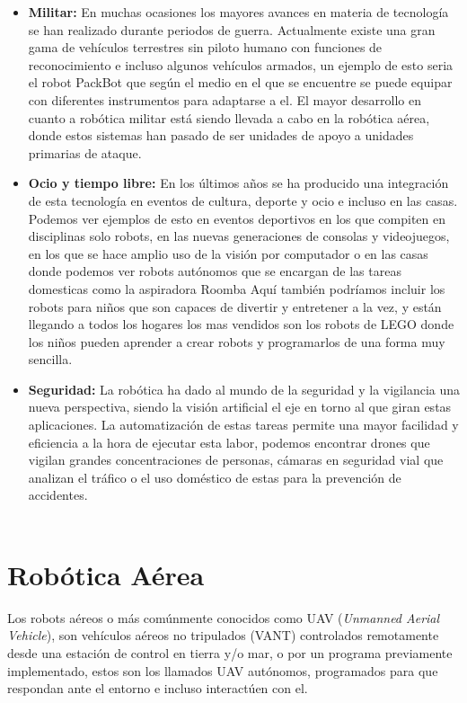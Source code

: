 \begin{itemize}
		\item \textbf{Militar: }En muchas ocasiones los mayores avances en materia de tecnología se han realizado durante periodos de guerra. Actualmente existe una gran gama de vehículos terrestres sin piloto humano con funciones de reconocimiento e incluso algunos vehículos armados, un ejemplo de esto seria el robot PackBot que según el medio en el que se encuentre se puede equipar con diferentes instrumentos para adaptarse a el. El mayor desarrollo en cuanto a robótica militar está siendo llevada a cabo en la robótica aérea, donde estos sistemas han pasado de ser unidades de apoyo a unidades primarias de ataque.
		\item \textbf{Ocio y tiempo libre: }En los últimos años se ha producido una integración de esta tecnología en eventos de cultura, deporte y ocio e incluso en las casas. Podemos ver ejemplos de esto en eventos deportivos en los que compiten en disciplinas solo robots, en las nuevas generaciones de consolas y videojuegos, en los que se hace amplio uso de la visión por computador o en las casas donde podemos ver robots autónomos que se encargan de las tareas domesticas como la aspiradora Roomba Aquí también podríamos incluir los robots para niños que son capaces de divertir y entretener a la vez, y están llegando a todos los hogares los mas vendidos son los robots de LEGO donde los niños pueden aprender a crear robots y programarlos de una forma muy sencilla.
		\item \textbf{Seguridad: }La robótica ha dado al mundo de la seguridad y la vigilancia una nueva perspectiva, siendo la visión artificial el eje en torno al que giran estas aplicaciones. La automatización de estas tareas permite una mayor facilidad y eficiencia a la hora de ejecutar esta labor, podemos encontrar drones que vigilan grandes concentraciones de personas, cámaras en seguridad vial que analizan el tráfico o el uso doméstico de estas para la prevención de accidentes.
		\\
		\\
\end{itemize}

\section{Robótica Aérea}
\hspace{1cm} Los robots aéreos o más comúnmente conocidos como UAV (\textit{Unmanned Aerial Vehicle}), son vehículos aéreos no tripulados (VANT) controlados remotamente desde una estación de control en tierra y/o mar, o por un programa previamente implementado, estos son los llamados UAV autónomos, programados para que respondan ante el entorno e incluso interactúen con el.

